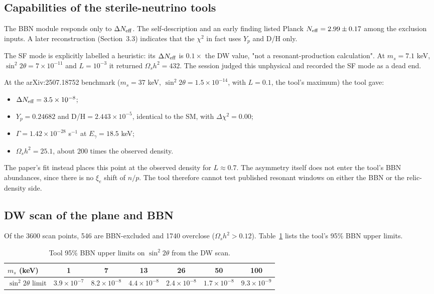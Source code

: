 \documentclass[11pt,a4paper]{article}
\begin{document}
\subsection{Capabilities of the sterile-neutrino tools}
The BBN module responds only to $\Delta N_{\rm eff}$. The self-description and an early finding listed Planck $N_{\rm eff}=2.99\pm0.17$ among the exclusion inputs. A later reconstruction (Section~3.3) indicates that the $\chi^2$ in fact uses $Y_p$ and D/H only.

The SF mode is explicitly labelled a heuristic: its $\Delta N_{\rm eff}$ is $0.1\times$ the DW value, "not a resonant-production calculation". At $m_s=7.1$ keV, $\sin^2 2\theta=7\times10^{-11}$ and $L=10^{-3}$ it returned $\Omega_s h^2=432$. The session judged this unphysical and recorded the SF mode as a dead end.

At the arXiv:2507.18752 benchmark ($m_s=37$ keV, $\sin^2 2\theta=1.5\times10^{-14}$, with $L=0.1$, the tool's maximum) the tool gave:
\begin{itemize}
\item $\Delta N_{\rm eff}=3.5\times10^{-8}$;
\item $Y_p=0.24682$ and D/H$=2.443\times10^{-5}$, identical to the SM, with $\Delta\chi^2=0.00$;
\item $\Gamma=1.42\times10^{-28}$ s$^{-1}$ at $E_\gamma=18.5$ keV;
\item $\Omega_s h^2=25.1$, about 200 times the observed density.
\end{itemize}
The paper's fit instead places this point at the observed density for $L\approx0.7$. The asymmetry itself does not enter the tool's BBN abundances, since there is no $\xi_e$ shift of $n/p$. The tool therefore cannot test published resonant windows on either the BBN or the relic-density side.

\subsection{DW scan of the plane and BBN}
Of the 3600 scan points, 546 are BBN-excluded and 1740 overclose ($\Omega_s h^2>0.12$). Table~\ref{tab:bbnlim} lists the tool's 95\% BBN upper limits.

\begin{table}[h]
\centering
\caption{Tool 95\% BBN upper limits on $\sin^2 2\theta$ from the DW scan.}
\label{tab:bbnlim}
\begin{tabular}{lcccccc}
\toprule
$m_s$ (keV) & 1 & 7 & 13 & 26 & 50 & 100\\
\midrule
$\sin^2 2\theta$ limit & $3.9\times10^{-7}$ & $8.2\times10^{-8}$ & $4.4\times10^{-8}$ & $2.4\times10^{-8}$ & $1.7\times10^{-8}$ & $9.3\times10^{-9}$\\
\bottomrule
\end{tabular}
\end{table}
\end{document}
